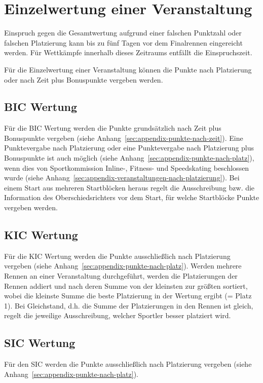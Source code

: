 \section{Einzelwertung einer Veranstaltung}
Einspruch gegen die Gesamtwertung aufgrund einer falschen Punktzahl oder falschen Platzierung kann bis zu fünf Tagen vor dem Finalrennen eingereicht werden. Für Wettkämpfe innerhalb dieses Zeitraums entfällt die Einspruchszeit.

Für die Einzelwertung einer Veranstaltung können die Punkte nach Platzierung oder nach Zeit plus Bonuspunkte vergeben werden.

\subsection{BIC Wertung}
Für die BIC Wertung werden die Punkte grundsätzlich nach Zeit plus Bonuspunkte vergeben (siehe Anhang~\ref{sec:appendix-punkte-nach-zeit}). Eine Punktevergabe nach Platzierung oder eine Punktevergabe nach Platzierung plus Bonuspunkte ist auch möglich (siehe Anhang~\ref{sec:appendix-punkte-nach-platz}), wenn dies von Sportkommission Inline-, Fitness- und Speedskating beschlossen wurde (siehe Anhang~\ref{sec:appendix-veranstaltungen-nach-platzierung}). Bei einem Start aus mehreren Startblöcken heraus regelt die Ausschreibung bzw. die Information des Oberschiedsrichters vor dem Start, für welche Startblöcke Punkte vergeben werden.

\subsection{KIC Wertung}
Für die KIC Wertung werden die Punkte ausschließlich nach Platzierung vergeben (siehe Anhang~\ref{sec:appendix-punkte-nach-platz}). Werden mehrere Rennen an einer Veranstaltung durchgeführt, werden die Platzierungen der Rennen addiert und nach deren Summe von der kleinsten zur größten sortiert, wobei die kleinste Summe die beste Platzierung in der Wertung ergibt (= Platz 1). Bei Gleichstand, d.h. die Summe der Platzierungen in den Rennen ist gleich, regelt die jeweilige Ausschreibung, welcher Sportler besser platziert wird.

\subsection{SIC Wertung}
Für den SIC werden die Punkte ausschließlich nach Platzierung vergeben (siehe Anhang~\ref{sec:appendix-punkte-nach-platz}).
